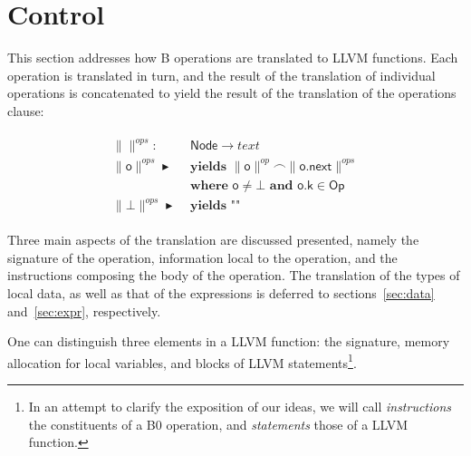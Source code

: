 \documentclass{article}
\newcommand{\trad}[2]{\ensuremath{\lVert \textsf{#1} \rVert^{\textit{#2}}}}
\newcommand{\mty}[0]{\texttt{""}}
\DeclareMathOperator{\conc}{\smallfrown}
\DeclareMathOperator{\isdef}{\blacktriangleright}
\begin{document}
\section{Control}
\label{sec:control}

This section addresses how B operations are translated to LLVM
functions. Each operation is translated in turn, and the result of
the translation of individual operations is concatenated to yield the
result of the translation of the operations clause:
\begin{framed}
\begin{align}
  \begin{split}
  \trad{}{ops} : & \textsf{ Node} \rightarrow text \\
  \trad{o}{ops} \isdef 
  & \textbf{ yields } \trad{o}{op} \conc \trad{o.next}{ops}  \\
  & \textbf{ where } \textsf{o} \neq \bot  \textbf{ and } \textsf{o.k} \in \textsf{Op}  \\
  \trad{$\bot$}{ops} \isdef
  & \textbf{ yields } \mty 
  \end{split}
\end{align}
\end{framed}

Three main aspects of the translation are discussed presented, namely
the signature of the operation, information local to the operation,
and the instructions composing the body of the operation. The
translation of the types of local data, as well as that of the
expressions is deferred to sections~\ref{sec:data} and~\ref{sec:expr},
respectively.

One can distinguish three elements in a LLVM function: the signature,
memory allocation for local variables, and blocks of LLVM
statements\footnote{In an attempt to clarify the exposition of our
  ideas, we will call \emph{instructions} the constituents of a B0
  operation, and \emph{statements} those of a LLVM function.}.
\end{document}
